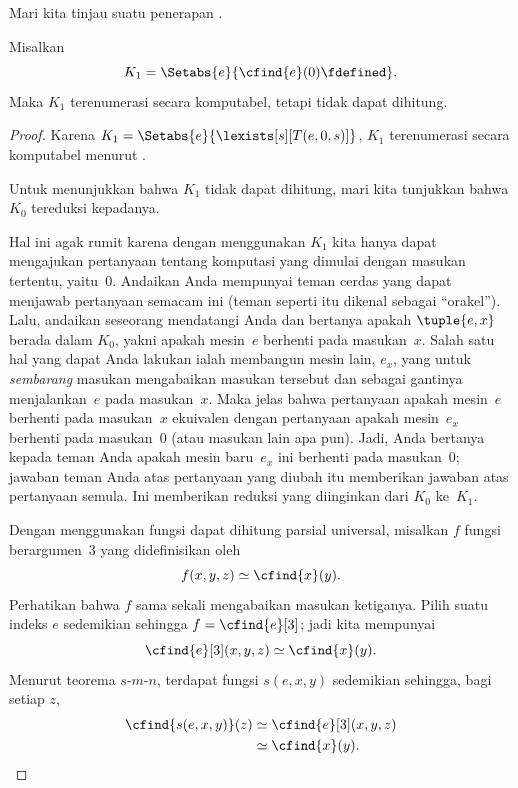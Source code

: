 \documentclass[../../../include/open-logic-section]{subfiles}
\begin{document}

Mari kita tinjau suatu penerapan .

\begin{prop}
Misalkan
\[
K_1 = \Setabs{e}{\cfind{e}(0) \fdefined}.
\]
Maka $K_1$ terenumerasi secara komputabel, tetapi tidak dapat dihitung.
\end{prop}

\begin{proof}
Karena $K_1 = \Setabs{e}{\lexists[s][T(e,0,s)]}$, $K_1$ terenumerasi
secara komputabel menurut .

Untuk menunjukkan bahwa $K_1$ tidak dapat dihitung, mari kita tunjukkan bahwa
$K_0$ tereduksi kepadanya.

\begin{explain}
Hal ini agak rumit karena dengan menggunakan $K_1$ kita hanya dapat mengajukan
pertanyaan tentang komputasi yang dimulai dengan masukan tertentu, yaitu~$0$.
Andaikan Anda mempunyai teman cerdas yang dapat menjawab pertanyaan semacam
ini (teman seperti itu dikenal sebagai ``orakel''). Lalu, andaikan seseorang
mendatangi Anda dan bertanya apakah $\tuple{e,x}$ berada dalam $K_0$, yakni
apakah mesin~$e$ berhenti pada masukan~$x$. Salah satu hal yang dapat Anda
lakukan ialah membangun mesin lain, $e_x$, yang untuk \emph{sembarang} masukan
mengabaikan masukan tersebut dan sebagai gantinya menjalankan~$e$ pada
masukan~$x$. Maka jelas bahwa pertanyaan apakah mesin~$e$ berhenti pada
masukan~$x$ ekuivalen dengan pertanyaan apakah mesin~$e_x$ berhenti pada
masukan~$0$ (atau masukan lain apa pun). Jadi, Anda bertanya kepada teman Anda
apakah mesin baru~$e_x$ ini berhenti pada masukan~$0$; jawaban teman Anda atas
pertanyaan yang diubah itu memberikan jawaban atas pertanyaan semula. Ini
memberikan reduksi yang diinginkan dari $K_0$ ke~$K_1$.
\end{explain}

Dengan menggunakan fungsi dapat dihitung parsial universal, misalkan $f$
fungsi berargumen~3 yang didefinisikan oleh
\[
f(x,y,z) \simeq \cfind{x}(y).
\]
Perhatikan bahwa $f$ sama sekali mengabaikan masukan ketiganya. Pilih suatu
indeks $e$ sedemikian sehingga $f = \cfind{e}[3]$; jadi kita mempunyai
\[
\cfind{e}[3](x,y,z) \simeq \cfind{x}(y).
\]
Menurut teorema $s$-$m$-$n$, terdapat fungsi $s(e,x,y)$ sedemikian sehingga,
bagi setiap $z$,
\begin{align*}
\cfind{s(e,x,y)}(z) & \simeq \cfind{e}[3](x,y,z) \\
& \simeq \cfind{x}(y).
\end{align*}


\end{proof}
\end{document}
